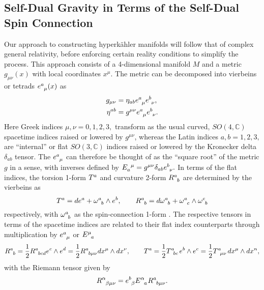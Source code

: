 \documentclass[a4paper,12pt, onecolumn, notitlepage]{article}
\theoremstyle{definition}
\theoremstyle{remark}
\newcommand{\al}{\alpha}
\newcommand{\w}{\omega}
\newcommand{\m}{\mu}
\newcommand{\n}{\nu}
\newcommand{\HK}{hyperk\"ahler }
\begin{document}
\subsection{Self-Dual Gravity in Terms of the Self-Dual Spin Connection}
Our approach to constructing \HK manifolds will follow that of complex general relativity, before enforcing certain reality conditions to simplify the process. This approach consists of a 4-dimensional manifold $M$ and a metric $g_{\m\n}(x)$ with local coordinates $x^{\m}.$ The metric can be decomposed into vierbeins or tetrads $e\indices{^a_\m}(x)$ as
\begin{align*}
	g_{\m\n} &= \eta_{ab}e\indices{^a_\m}e\indices{^b_\n},\\
	\eta^{ab} &= g^{\m\n}e\indices{^a_\m}e\indices{^b_\n}.
\end{align*}
Here Greek indices $\m,\n=0,1,2,3,$ transform as the usual curved, $SO(4,\mathbb{C})$ spacetime indices raised or lowered by $g^{\m\n}$, whereas the Latin indices $a,b=1,2,3,$ are ``internal'' or flat $SO(3,\mathbb{C})$ indices raised or lowered by the Kronecker delta $\delta_{ab}$ tensor. The $e\indices{^a_\m}$ can therefore be thought of as the ``square root'' of the metric $g$ in a sense, with inverses defined by $E\indices{_a^{\m}} = g^{\m\n}\delta_{ab}e\indices{^b_\n}.$ In terms of the flat indices, the torsion 1-form $T\indices{^a}$ and curvature 2-form $R\indices{^a_b}$ are determined by the vierbeins as
\begin{equation*}
	T\indices{^a} = de\indices{^a} + \w\indices{^a_b}\wedge e\indices{^b},\qquad R\indices{^a_b} = d\w\indices{^a_b} + \w\indices{^a_c}\wedge\w\indices{^c_b}
\end{equation*}
respectively, with $\w\indices{^a_b}$ as the spin-connection 1-form \cite{eguchi_1980}. The respective tensors in terms of the spacetime indices are related to their flat index counterparts through multiplication by $e\indices{^a_\m}$ or $E\indices{^\m_a}$
\begin{equation*}
R\indices{^a_b}=\frac{1}{2}R\indices{^a_b_c_d}e\indices{^c}\wedge e\indices{^d}=\frac{1}{2}R\indices{^a_b_\m_\n}dx\indices{^\m}\wedge dx\indices{^\n},\qquad T\indices{^a} = \frac{1}{2}T\indices{^a_b_c}e\indices{^b}\wedge e\indices{^c}=\frac{1}{2}T\indices{^a_\m_\n}dx\indices{^\m}\wedge dx\indices{^n},
\end{equation*}
with the Riemann tensor given by
\begin{equation*}
	\label{riemann}
	R\indices{^\al_\beta_\mu_\n} = e\indices{^b_\beta}E\indices{^\al_a}R\indices{^a_b_\m_\n}.
\end{equation*}
\end{document}
